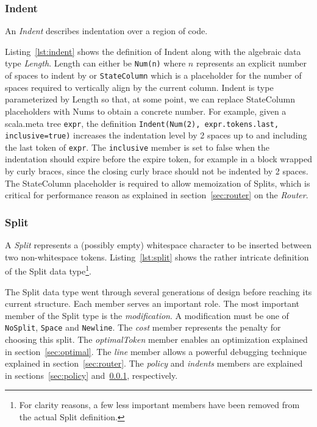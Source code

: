 \subsubsection{Indent}\label{sec:indent}
An \emph{Indent} describes indentation over a region of code.

Listing~\ref{lst:indent} shows the definition of Indent along with the algebraic data type \emph{Length}.
Length can either be \texttt{Num(n)} where $n$ represents an explicit number of spaces to indent by or \texttt{StateColumn} which is a placeholder for the number of spaces required to vertically align by the current column.
Indent is type parameterized by Length so that, at some point, we can replace StateColumn placeholders with Nums to obtain a concrete number.
For example, given a scala.meta tree \texttt{expr}, the definition \texttt{Indent(Num(2), expr.tokens.last, inclusive=true)}
increases the indentation level by 2 spaces up to and including the last token of \texttt{expr}.
The \texttt{inclusive} member is set to false when the indentation should expire before the expire token, for example in a block wrapped by curly braces, since the closing curly brace should not be indented by 2 spaces.
The StateColumn placeholder is required to allow memoization of Splits, which is critical for performance reason as explained in section~\ref{sec:router} on the \emph{Router}.

\subsubsection{Split}
A \emph{Split} represents a (possibly empty) whitespace character to be inserted between two non-whitespace tokens.
Listing~\ref{lst:split} shows the rather intricate definition of the Split data type\footnote{
  For clarity reasons, a few less important members have been removed from the actual Split definition.}.
\begin{minipage}{\linewidth}
  
\end{minipage}
The Split data type went through several generations of design before reaching its current structure.
Each member serves an important role.
The most important member of the Split type is the \emph{modification}.
A modification must be one of \texttt{NoSplit}, \texttt{Space} and \texttt{Newline}.
The \emph{cost} member represents the penalty for choosing this split.
The \emph{optimalToken} member enables an optimization explained in section~\ref{sec:optimal}.
The \emph{line} member allows a powerful debugging technique explained in section~\ref{sec:router}.
The \emph{policy} and \emph{indents} members are explained in sections~\ref{sec:policy} and~\ref{sec:indent}, respectively.


